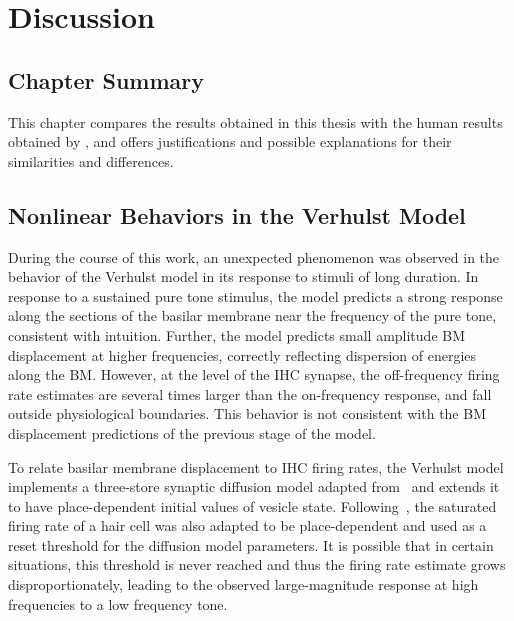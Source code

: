 \chapter{Discussion}
\label{chapter:Discussion}
\thispagestyle{myheadings}

\graphicspath{{6_Discussion/Figures/}}
\section{Chapter Summary} %
\label{sec:discussion_summary}
This chapter compares the results obtained in this thesis with the human results obtained by \citeauthor{Mehraei2016Auditory}, and offers justifications and possible explanations for their similarities and differences.
\section{Nonlinear Behaviors in the Verhulst Model} %
\label{sec:nonlinear_behaviors_in_the_verhulst_model}
During the course of this work, an unexpected phenomenon was observed in the behavior of the Verhulst model in its response to stimuli of long duration.  In response to a sustained pure tone stimulus, the model predicts a strong response along the sections of the basilar membrane near the frequency of the pure tone, consistent with intuition. Further, the model predicts small amplitude BM displacement at higher frequencies, correctly reflecting dispersion of energies along the BM.  However, at the level of the IHC synapse, the off-frequency firing rate estimates are several times larger than the on-frequency response, and fall outside physiological boundaries. This behavior is not consistent with the BM displacement predictions of the previous stage of the model.  

To relate basilar membrane displacement to IHC firing rates, the Verhulst model implements a three-store synaptic diffusion model adapted from~\cite{Westerman1988Diffusion} and extends it to have place-dependent initial values of vesicle state.   Following~\cite{Liberman1978AuditoryNerve}, the saturated firing rate of a hair cell was also adapted to be place-dependent and used as a reset threshold for the diffusion model parameters.  It is possible that in certain situations, this threshold is never reached and thus the firing rate estimate grows disproportionately, leading to the observed large-magnitude response at high frequencies to a low frequency tone.

